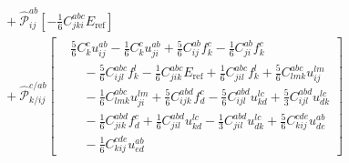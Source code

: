 \begin{align}
&\quad {}+ \widehat{\mathcal P}^{ab}_{ij}\left[ -\frac{1}{6} C^{abc}_{jki} E_{\mathrm{ref}} \right] \\
&\quad {}+ \widehat{\mathcal P}^{c/ab}_{k/ij}\left[\begin{aligned}& \frac{5}{6} C^{c}_{k} u^{ab}_{ij} - \frac{1}{6} C^{c}_{k} u^{ab}_{ji} + \frac{5}{6} C^{ab}_{ij} f^{c}_{k} - \frac{1}{6} C^{ab}_{ji} f^{c}_{k} \\ &\quad -\frac{5}{6} C^{abc}_{ijl} f^{l}_{k} - \frac{1}{6} C^{abc}_{jik} E_{\mathrm{ref}} + \frac{1}{6} C^{abc}_{jil} f^{l}_{k} + \frac{5}{6} C^{abc}_{lmk} u^{lm}_{ij} \\ &\quad -\frac{1}{6} C^{abc}_{lmk} u^{lm}_{ji} + \frac{5}{6} C^{abd}_{ijk} f^{c}_{d} - \frac{5}{6} C^{abd}_{ijl} u^{lc}_{kd} + \frac{5}{3} C^{abd}_{ijl} u^{lc}_{dk} \\ &\quad -\frac{1}{6} C^{abd}_{jik} f^{c}_{d} + \frac{1}{6} C^{abd}_{jil} u^{lc}_{kd} - \frac{1}{3} C^{abd}_{jil} u^{lc}_{dk} + \frac{5}{6} C^{cde}_{kij} u^{ab}_{de} \\ &\quad -\frac{1}{6} C^{cde}_{kij} u^{ab}_{ed}\end{aligned}\right] \\

\end{align}
